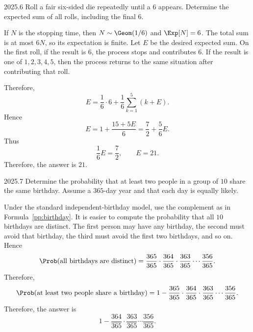    \begin{pastproblem}{2025.6}
        Roll a fair six-sided die repeatedly until a $6$ appears. Determine the expected sum of all
        rolls, including the final $6$.
    \end{pastproblem}

    \begin{solution}
        If $N$ is the stopping time, then $N\sim\Geom(1/6)$ and $\Exp[N]=6$. The total sum is at most $6N$, so its expectation is finite. Let $E$ be the desired expected sum. On the first roll, if the result is $6$, the process
        stops and contributes $6$. If the result is one of $1,2,3,4,5$, then the process returns to
        the same situation after contributing that roll.

        Therefore,
        \[
            E
            =
            \frac16\cdot 6
            +
            \frac16\sum_{k=1}^{5}(k+E).
        \]
        Hence
        \[
            E
            =
            1+\frac{15+5E}{6}
            =
            \frac72+\frac56E.
        \]
        Thus
        \[
            \frac16E=\frac72,
            \qquad
            E=21.
        \]
        Therefore, the answer is $\boxed{21}$.
    \end{solution}

    \begin{pastproblem}{2025.7}
        Determine the probability that at least two people in a group of $10$ share the same
        birthday. Assume a $365$-day year and that each day is equally likely.
    \end{pastproblem}

    \begin{solution}
        Under the standard independent-birthday model, use the complement as in Formula~\ref{pp:birthday}. It is easier to compute the probability that all $10$ birthdays are distinct.
        The first person may have any birthday, the second must avoid that birthday, the third must
        avoid the first two birthdays, and so on. Hence
        \[
            \Prob(\text{all birthdays are distinct})
            =
            \frac{365}{365}\cdot\frac{364}{365}\cdot\frac{363}{365}\cdots\frac{356}{365}.
        \]
        Therefore,
        \[
            \Prob(\text{at least two people share a birthday})
            =
            1-\frac{365}{365}\cdot\frac{364}{365}\cdot\frac{363}{365}\cdots\frac{356}{365}.
        \]
        Therefore, the answer is
        \[
            \boxed{1-\frac{364}{365}\cdot\frac{363}{365}\cdots\frac{356}{365}}.
        \]
    \end{solution}

